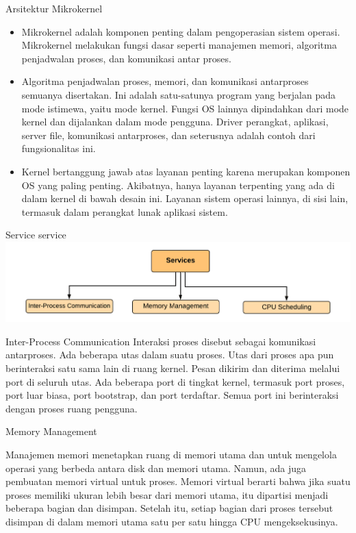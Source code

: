 \documentclass[aspectratio=169, table]{beamer}
\begin{document}
    \begin{frame}{Arsitektur Mikrokernel}
        \begin{itemize}
            \item Mikrokernel adalah komponen penting dalam pengoperasian sistem operasi. Mikrokernel melakukan fungsi dasar seperti manajemen memori, algoritma penjadwalan proses, dan komunikasi antar proses.

            \item Algoritma penjadwalan proses, memori, dan komunikasi antarproses semuanya disertakan. Ini adalah satu-satunya program yang berjalan pada mode istimewa, yaitu mode kernel. Fungsi OS lainnya dipindahkan dari mode kernel dan dijalankan dalam mode pengguna. Driver perangkat, aplikasi, server file, komunikasi antarproses, dan seterusnya adalah contoh dari fungsionalitas ini.

            \item Kernel bertanggung jawab atas layanan penting karena merupakan komponen OS yang paling penting. Akibatnya, hanya layanan terpenting yang ada di dalam kernel di bawah desain ini. Layanan sistem operasi lainnya, di sisi lain, termasuk dalam perangkat lunak aplikasi sistem.
        \end{itemize}
    \end{frame}


    \begin{frame}{Service}
        service
        \includegraphics[width=1\textwidth]{Mikrokernel-2.png}
    \end{frame}


    \begin{frame}{Inter-Process Communication}
        Interaksi proses disebut sebagai komunikasi antarproses. Ada beberapa utas dalam suatu proses. Utas dari proses apa pun berinteraksi satu sama lain di ruang kernel. Pesan dikirim dan diterima melalui port di seluruh utas. Ada beberapa port di tingkat kernel, termasuk port proses, port luar biasa, port bootstrap, dan port terdaftar. Semua port ini berinteraksi dengan proses ruang pengguna.
    \end{frame}


    \begin{frame}{Memory Management}

        Manajemen memori menetapkan ruang di memori utama dan untuk mengelola operasi yang berbeda antara disk dan memori utama. Namun, ada juga pembuatan memori virtual untuk proses. Memori virtual berarti bahwa jika suatu proses memiliki ukuran lebih besar dari memori utama, itu dipartisi menjadi beberapa bagian dan disimpan. Setelah itu, setiap bagian dari proses tersebut disimpan di dalam memori utama satu per satu hingga CPU mengeksekusinya.
    \end{frame}
\end{document}
